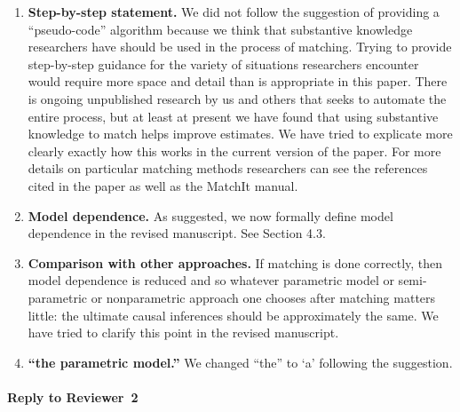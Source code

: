 \documentclass[11pt]{article}
\begin{document}
\begin{enumerate}
\item {\bf Step-by-step statement.} We did not follow the suggestion
  of providing a ``pseudo-code'' algorithm because we think that
  substantive knowledge researchers have should be used in the process
  of matching.  Trying to provide step-by-step guidance for the variety of
  situations researchers encounter would require more space and detail than is appropriate
  in this paper.   There is ongoing unpublished 
  research by us and others
  that seeks to automate the entire process, but at least at present we
  have found that using substantive knowledge to match helps improve
  estimates.  We have tried to explicate more clearly exactly how this
  works in the current version of the paper.  For more details on particular matching methods
  researchers can see the references cited in the paper as well as the MatchIt manual.
  
\item {\bf Model dependence.} As suggested, we now formally define
  model dependence in the revised manuscript. See Section 4.3.
  
\item {\bf Comparison with other approaches.} If matching is done
  correctly, then model dependence is reduced and so whatever
  parametric model or semi-parametric or nonparametric approach one
  chooses after matching matters little: the ultimate causal
  inferences should be approximately the same.  We have tried to
  clarify this point in the revised manuscript.


\item {\bf ``the parametric model.''} We changed ``the'' to `a'
  following the suggestion.
\end{enumerate}


\paragraph{Reply to Reviewer~2}
\end{document}
